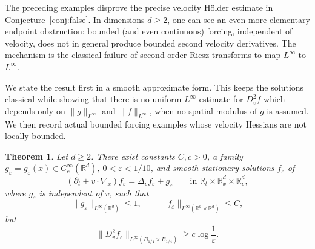 \documentclass[11pt,reqno]{amsart}
\numberwithin{equation}{section}
\newtheorem{theorem}{Theorem}[section]
\theoremstyle{remark}
\newcommand{\R}{\mathbb{R}}
\begin{document}
The preceding examples disprove the precise velocity H\"older estimate in
Conjecture~\ref{conj:false}.  In dimensions \(d\ge2\), one can see an even
more elementary endpoint obstruction: bounded {(and even continuous)} forcing, independent of
velocity, does not in general produce bounded second velocity derivatives.
The mechanism is the classical failure of second-order Riesz transforms to
map \(L^\infty\) to \(L^\infty\).

We state the result first in a smooth approximate form.  This keeps the
solutions classical while showing that {there is} no uniform \(L^\infty\) estimate for
\(D_v^2f\) {which depends} only on \(\|g\|_{L^\infty}\) and \(\|f\|_{L^\infty}\),
when no spatial modulus of \(g\) is assumed.  We then record actual bounded
forcing examples whose velocity Hessians are not locally bounded.

\begin{theorem}\label{prop:Linfty-endpoint-smooth}
Let \(d\ge2\).  There exist constants \(C,c>0\), a family
\(g_\varepsilon{=g_\varepsilon(x)}\in C_c^\infty(\R^d)\), \(0<\varepsilon<1/10\), and smooth
stationary solutions \(f_\varepsilon\) of
\begin{equation}\label{eq:Linfty-endpoint-equation}
   (\partial_t+v\cdot\nabla_x)f_\varepsilon
   =\Delta_v f_\varepsilon+g_\varepsilon
   \qquad\text{in }\R_t\times\R_x^d\times\R_v^d,
\end{equation}
where \(g_\varepsilon\) is independent of \(v\), such that
\[
   \|g_\varepsilon\|_{L^\infty(\R^d)}\le1,
   \qquad
   \|f_\varepsilon\|_{L^\infty(\R^d\times\R^d)}\le C,
\]
but
\[
   \|D_v^2f_\varepsilon\|_{L^\infty(B_{1/4}\times B_{1/4})}
   \ge c\log\frac1\varepsilon.
\]
\end{theorem}
\end{document}
